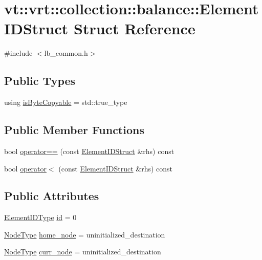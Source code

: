 \hypertarget{structvt_1_1vrt_1_1collection_1_1balance_1_1_element_i_d_struct}{}\section{vt\+:\+:vrt\+:\+:collection\+:\+:balance\+:\+:Element\+I\+D\+Struct Struct Reference}
\label{structvt_1_1vrt_1_1collection_1_1balance_1_1_element_i_d_struct}


{\ttfamily \#include $<$lb\+\_\+common.\+h$>$}

\subsection*{Public Types}
\begin{DoxyCompactItemize}
\item 
using \hyperlink{structvt_1_1vrt_1_1collection_1_1balance_1_1_element_i_d_struct_a4a5e2778f19d4b5865c45c5fa2aef344}{is\+Byte\+Copyable} = std\+::true\+\_\+type
\end{DoxyCompactItemize}
\subsection*{Public Member Functions}
\begin{DoxyCompactItemize}
\item 
bool \hyperlink{structvt_1_1vrt_1_1collection_1_1balance_1_1_element_i_d_struct_a8dc233cba462007e9a2d96b2eed4ac9b}{operator==} (const \hyperlink{structvt_1_1vrt_1_1collection_1_1balance_1_1_element_i_d_struct}{Element\+I\+D\+Struct} \&rhs) const
\item 
bool \hyperlink{structvt_1_1vrt_1_1collection_1_1balance_1_1_element_i_d_struct_a1fb50ba7df5e1786461d99208056ecde}{operator$<$} (const \hyperlink{structvt_1_1vrt_1_1collection_1_1balance_1_1_element_i_d_struct}{Element\+I\+D\+Struct} \&rhs) const
\end{DoxyCompactItemize}
\subsection*{Public Attributes}
\begin{DoxyCompactItemize}
\item 
\hyperlink{namespacevt_1_1vrt_1_1collection_1_1balance_a14c8d2c972f2913aa3f1636e5be0a120}{Element\+I\+D\+Type} \hyperlink{structvt_1_1vrt_1_1collection_1_1balance_1_1_element_i_d_struct_a3acb6937689a2fa83dbaac464fee4c54}{id} = 0
\item 
\hyperlink{namespacevt_a866da9d0efc19c0a1ce79e9e492f47e2}{Node\+Type} \hyperlink{structvt_1_1vrt_1_1collection_1_1balance_1_1_element_i_d_struct_ae2615194ecf0f255aff8a38d3d48dd82}{home\+\_\+node} = uninitialized\+\_\+destination
\item 
\hyperlink{namespacevt_a866da9d0efc19c0a1ce79e9e492f47e2}{Node\+Type} \hyperlink{structvt_1_1vrt_1_1collection_1_1balance_1_1_element_i_d_struct_aa51469e2067175092e7d02ef8b3226ac}{curr\+\_\+node} = uninitialized\+\_\+destination
\end{DoxyCompactItemize}


